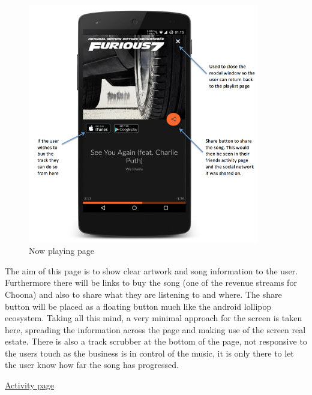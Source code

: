 \noindent
\begin{figure}[h!]
\centering
\includegraphics[width=0.9\textwidth]{./img/nowplayingannotated.png}
\caption{Now playing page}
\label{fig:nowplaying}
\end{figure}

The aim of this page is to show clear artwork and song information to the user. Furthermore there will be links to buy the song (one of the revenue streams for Choona) and also to share what they are listening to and where. The share button will be placed as a floating button much like the android lollipop ecosystem. Taking all this mind, a very minimal approach for the screen is taken here, spreading the information across the page and making use of the screen real estate. There is also a track scrubber at the bottom of the page, not responsive to the users touch as the business is in control of the music, it is only there to let the user know how far the song has progressed.   

\newpage

\noindent\underline{Activity page}\newline


